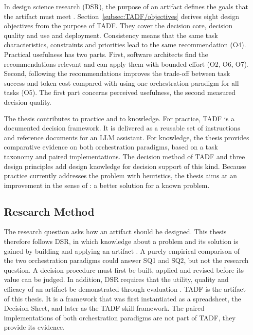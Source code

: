 In design science research (DSR), the purpose of an artifact defines the goals that the artifact must meet \parencite{gregorPositioningPresentingDesign2013}. Section~\ref{subsec:TADF/objectives} derives eight design objectives from the purpose of TADF. They cover the decision core, decision quality and use and deployment. Consistency means that the same task characteristics, constraints and priorities lead to the same recommendation (O4). Practical usefulness has two parts. First, software architects find the recommendations relevant and can apply them with bounded effort (O2, O6, O7). Second, following the recommendations improves the trade-off between task success and token cost compared with using one orchestration paradigm for all tasks (O5). The first part concerns perceived usefulness, the second measured decision quality.
 
The thesis contributes to practice and to knowledge. For practice, TADF is a documented decision framework. It is delivered as a reusable set of instructions and reference documents for an LLM assistant. For knowledge, the thesis provides comparative evidence on both orchestration paradigms, based on a task taxonomy and paired implementations. The decision method of TADF and three design principles add design knowledge for decision support of this kind. Because practice currently addresses the problem with heuristics, the thesis aims at an improvement in the sense of \textcite{gregorPositioningPresentingDesign2013}: a better solution for a known problem.

\subsection{Research Method}
\label{subsec:intro/method}
The research question asks how an artifact should be designed. This thesis therefore follows DSR, in which knowledge about a problem and its solution is gained by building and applying an artifact \parencite{hevnerDesignScienceInformation2004}. A purely empirical comparison of the two orchestration paradigms could answer SQ1 and SQ2, but not the research question. A decision procedure must first be built, applied and revised before its value can be judged. In addition, DSR requires that the utility, quality and efficacy of an artifact be demonstrated through evaluation \parencite{hevnerDesignScienceInformation2004}. TADF is the artifact of this thesis. It is a framework that was first instantiated as a spreadsheet, the Decision Sheet, and later as the TADF skill framework. The paired implementations of both orchestration paradigms are not part of TADF, they provide its evidence.
 
